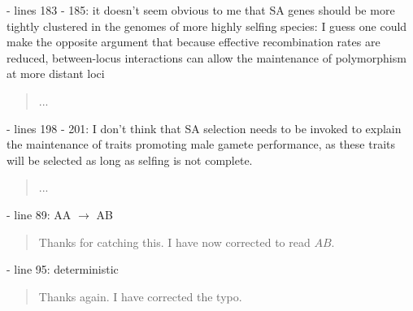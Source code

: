 \documentclass[11pt]{article}
\begin{document}
 - lines 183 - 185: it doesn't seem obvious to me that SA genes should be more tightly clustered in the genomes of more highly selfing species: I guess one could make the opposite argument that because effective recombination rates are reduced, between-locus interactions can allow the maintenance of polymorphism at more distant loci

	\begin{quote}
		...
	\end{quote}

 - lines 198 - 201: I don't think that SA selection needs to be invoked to explain the maintenance of traits promoting male gamete performance, as these traits will be selected as long as selfing is not complete.

	\begin{quote}
		...
	\end{quote}

 - line 89: AA $\rightarrow$ AB

	\begin{quote}
		Thanks for catching this. I have now corrected to read $AB$.
	\end{quote}

 - line 95: deterministic

	\begin{quote}
		Thanks again. I have corrected the typo.
	\end{quote}
\end{document}
